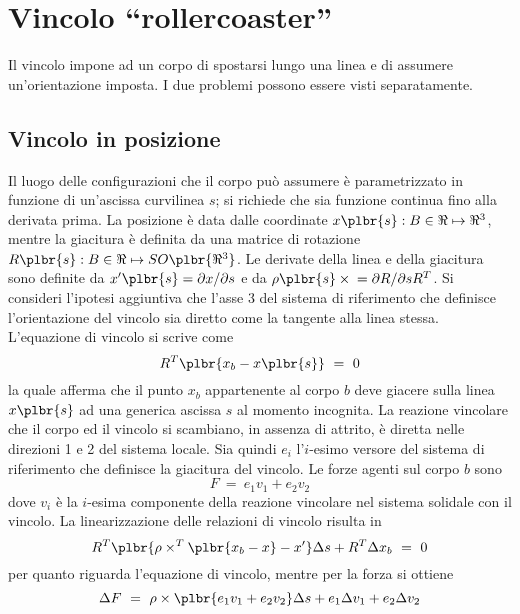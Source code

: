 \documentclass[12pt,dvips,fleqn]{article}
\begin{document}
\section*{Vincolo ``rollercoaster''}
Il vincolo impone ad un corpo di spostarsi lungo una linea e di assumere
un'orientazione imposta.
I due problemi possono essere visti separatamente.

\subsection*{Vincolo in posizione}
Il luogo delle configurazioni che il corpo pu\`{o} assumere \`{e}
parametrizzato in funzione di un'ascissa curvilinea $ s $; si richiede che
sia funzione continua fino alla derivata prima.
La posizione \`{e} data dalle coordinate $ x\plbr{s}:B\in\Re\mapsto\Re^3 $,
mentre la giacitura \`{e} definita da una matrice di rotazione
$ R\plbr{s}:B\in\Re\mapsto{SO\plbr{\Re^3}} $.
Le derivate della linea e della giacitura sono definite da
$ x'\plbr{s}=\partial{x}/\partial{s} $ e da
$ \rho\plbr{s}\times{}=\partial{R}/\partial{s}R^T $.
Si consideri l'ipotesi aggiuntiva che l'asse 3 del sistema di riferimento
che definisce l'orientazione del vincolo sia diretto come la tangente alla
linea stessa.
L'equazione di vincolo si scrive come
\begin{displaymath}
    R^T\plbr{x_b-x\plbr{s}} \ = \ 0
\end{displaymath}
la quale afferma che il punto $ x_b $ appartenente al corpo $ b $ deve
giacere sulla linea $ x\plbr{s} $ ad una generica ascissa $ s $ al momento
incognita.
La reazione vincolare che il corpo ed il vincolo si scambiano, in assenza di
attrito, \`{e} diretta nelle direzioni 1 e 2 del sistema locale.
Sia quindi $ e_i $ l'$i$-esimo versore del sistema di riferimento che
definisce la giacitura del vincolo.
Le forze agenti sul corpo $ b $ sono
\begin{displaymath}
    F \ = \ e_1v_1+e_2v_2
\end{displaymath}
dove $ v_i $ \`{e} la $i$-esima componente della reazione vincolare nel
sistema solidale con il vincolo.
La linearizzazione delle relazioni di vincolo risulta in
\begin{displaymath}
    R^T\plbr{\rho\times^T\plbr{x_b-x}-x'}\Delta{s}+R^T\Delta{x_b} \ = \ 0
\end{displaymath}
per quanto riguarda l'equazione di vincolo, mentre per la forza si ottiene
\begin{displaymath}
    \Delta{F} \ = \ 
        \rho\times\plbr{e_1v_1+e_2v_2}\Delta{s}+e_1\Delta{v_1}+e_2\Delta{v_2}
\end{displaymath}
\end{document}
